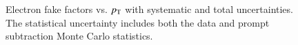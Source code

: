 \begin{figure}[htbp] 
  \centering
  \caption{Electron fake factors vs. $p_{\text{T}}$ with systematic and total uncertainties. The statistical uncertainty includes both the data and prompt subtraction Monte Carlo statistics.}
  \label{fig:electron-fake-factor-uncertainties}
\end{figure}


